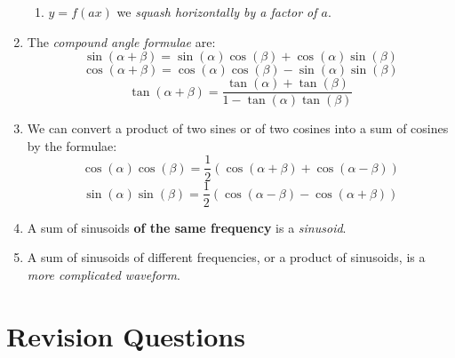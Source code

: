 \documentclass{article}
\begin{document}
\begin{enumerate}
\begin{enumerate}
		\item $y=f(ax)$ we \textit{squash horizontally by a factor of $a$}.
	\end{enumerate}
\item The \textit{compound angle formulae} are:
	\[\sin(\alpha+\beta)=\sin(\alpha)\cos(\beta)+\cos(\alpha)\sin(\beta)\]
	\[\cos(\alpha+\beta)=\cos(\alpha)\cos(\beta)-\sin(\alpha)\sin(\beta)\]
	\[\tan(\alpha+\beta)=\frac{\tan(\alpha)+\tan(\beta)}{1-\tan(\alpha)\tan(\beta)}\]
\item We can convert a product of two sines or of two cosines into a sum of cosines by the formulae:
	\[\cos(\alpha)\cos(\beta)=\frac{1}{2}\left(\cos(\alpha+\beta)+\cos(\alpha-\beta)\right)\]
	\[\sin(\alpha)\sin(\beta)=\frac{1}{2}\left(\cos(\alpha-\beta)-\cos(\alpha+\beta)\right)\]
\item A sum of sinusoids \textbf{of the same frequency} is a \textit{sinusoid}.
\item A sum of sinusoids of different frequencies, or a product of sinusoids, is a \textit{more complicated waveform}.
\end{enumerate}


\clearpage

\section{Revision Questions}
\end{document}
